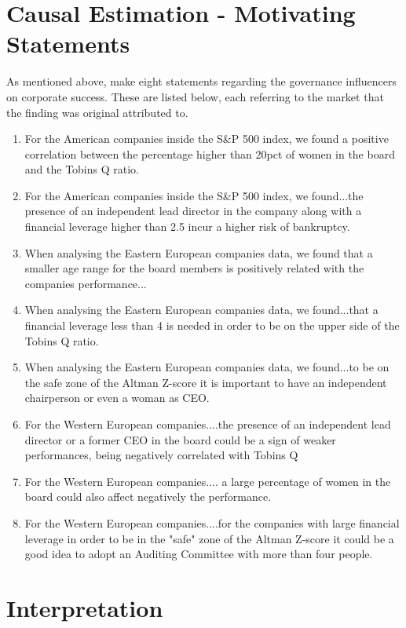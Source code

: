 {\section{Causal Estimation - Motivating Statements}\label{CausalEstimation-ResearchQuestions}
{As mentioned above, \cite{moldovan2015learning} make eight statements regarding the governance influencers on corporate success. These are listed below, each referring to the market that the finding was original attributed to. }
\begin{enumerate}
  \item For the American companies inside the S\&P 500 index, we found a positive correlation between the percentage higher than 20pct of women in the board and the Tobins Q ratio. \label{spOne}
  \item For the American companies inside the S\&P 500 index, we found...the presence of an independent lead director in the company along with a financial leverage higher than 2.5 incur a higher risk of bankruptcy. \label{sptne}
  \item When analysing the Eastern European companies data, we found that a smaller age range for the board members is positively related with the companies performance...  \label{eastOne}
  \item When analysing the Eastern European companies data, we found...that a financial leverage less than 4 is needed in order to be on the upper side of the Tobins Q ratio. \label{eastTwo}
  \item When analysing the Eastern European companies data, we found...to be on the safe zone of the Altman Z-score it is important to have an independent chairperson or even a woman as CEO.  \label{eastThree}
  \item For the Western European companies....the presence of an independent lead director or a former CEO in the board could be a sign of weaker performances, being negatively correlated with Tobins Q  \label{westOne}
  \item For the Western European companies.... a large percentage of women in the board could also affect negatively the performance. \label{westTwo}
  \item For the Western European companies....for the companies with large financial leverage in order to be in the "safe" zone of the Altman Z-score it could be a good idea to adopt an Auditing Committee with more than four people. \label{westThree}
\end{enumerate}


\section{Interpretation}
}
